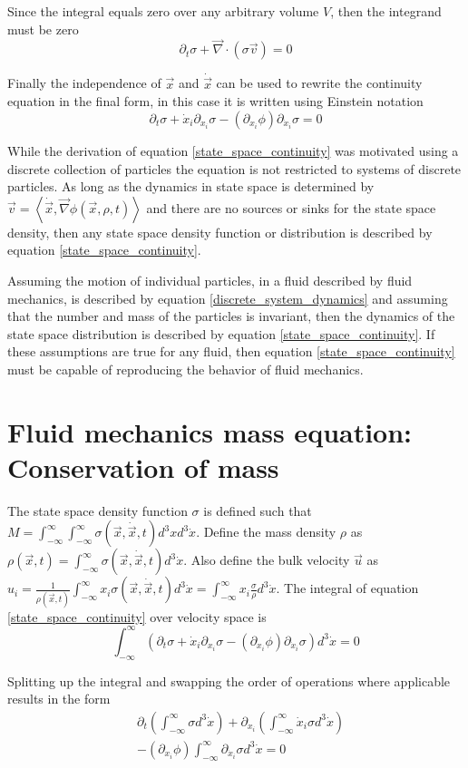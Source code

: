 \documentclass[%
 reprint,
 amsmath,amssymb,
 aps,
]{revtex4-1}
\newcommand{\dvec}[1]{\dot{\vec{#1}}}
\newcommand{\grad}{\vec{\nabla}}
\newcommand{\intVdot}[1]{\int_{-\infty}^{\infty} #1 d^3\dot{x}}
\newcommand{\intVVdot}[1]{\int_{-\infty}^{\infty}\int_{-\infty}^{\infty} #1 d^3xd^3\dot{x}}
\begin{document}
Since the integral equals zero over any arbitrary volume $V$, then the integrand must be zero
\[
\partial_t \sigma + \grad\cdot\left(\sigma\vec{v}\right)=0
\]

Finally the independence of $\vec{x}$ and $\dvec{x}$ can be used to rewrite the continuity equation in the final form, in this case it is written using Einstein notation
\begin{equation}
\partial_t \sigma + \dot{x}_i\partial_{x_i}\sigma-\left(\partial_{x_i}\phi\right)\partial_{\dot{x}_i}\sigma=0
\label{state_space_continuity}
\end{equation}

While the derivation of equation \eqref{state_space_continuity} was motivated using a discrete collection of particles the equation is not restricted to systems of discrete particles. As long as the dynamics in state space is determined by $\vec{v}=\left\langle\dvec{x}, \grad\phi(\vec{x}, \rho, t)\right\rangle$ and there are no sources or sinks for the state space density, then any state space density function or distribution is described by equation \eqref{state_space_continuity}.

Assuming the motion of individual particles, in a fluid described by fluid mechanics, is described by equation \eqref{discrete_system_dynamics} and assuming that the number and mass of the particles is invariant, then the dynamics of the state space distribution is described by equation \eqref{state_space_continuity}. If these assumptions are true for any fluid, then equation \eqref{state_space_continuity} must be capable of reproducing the behavior of fluid mechanics.

\section{Fluid mechanics mass equation: Conservation of mass}
The state space density function $\sigma$ is defined such that $M=\intVVdot{\sigma(\vec{x}, \dvec{x}, t)}$. Define the mass density $\rho$ as $\rho(\vec{x}, t)=\intVdot{\sigma(\vec{x}, \dvec{x}, t)}$. Also define the bulk velocity $\vec{u}$ as $u_i=\frac{1}{\rho(\vec{x}, t)}\intVdot{x_i\sigma(\vec{x}, \dvec{x}, t)}=\intVdot{x_i\frac{\sigma}{\rho}}$. The integral of equation \eqref{state_space_continuity} over velocity space is
\[
\intVdot{\left(\partial_t \sigma + \dot{x}_i\partial_{x_i}\sigma-\left(\partial_{x_i}\phi\right)\partial_{\dot{x}_i}\sigma\right)}=0
\]

Splitting up the integral and swapping the order of operations where applicable results in the form
\[
\begin{split}
& \partial_t\left(\intVdot{\sigma}\right) + \partial_{x_i}\left(\intVdot{\dot{x}_i\sigma}\right) \\ & - \left(\partial_{x_i}\phi\right)\intVdot{\partial_{\dot{x}_i}\sigma}=0
\end{split}
\]
\end{document}
